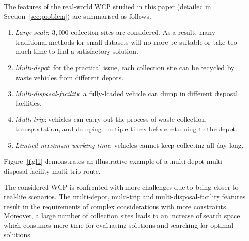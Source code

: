 \documentclass[journal]{IEEEtran}
\begin{document}
The features of the real-world WCP studied in this paper (detailed in Section~\ref{sec:problem}) are summarised as follows. 
\begin{enumerate}[leftmargin=*,label=(\roman*)]
\item \emph{Large-scale}: $3,000$ collection sites are considered. As a result, many traditional methods for small datasets will no more be suitable or take too much time to find a satisfactory solution. 
\item \emph{Multi-depot}: for the practical issue, each collection site can be recycled by waste vehicles from different depots. 
\item \emph{Multi-disposal-facility}: a fully-loaded vehicle can dump in different disposal facilities. 
\item \emph{Multi-trip}: vehicles can carry out the process of waste collection, transportation, and dumping multiple times before returning to the depot.  
\item \emph{Limited maximum working time}: vehicles cannot keep collecting all day long. 
\end{enumerate}
Figure~\ref{figl1} demonstrates an illustrative example of a multi-depot multi-disposal-facility multi-trip route.

The considered WCP is confronted with more challenges due to being closer to real-life scenarios. The multi-depot, multi-trip and multi-disposal-facility features result in the requirements of complex considerations with more constraints. Moreover, a large number of collection sites leads to an increase of search space which consumes more time for evaluating solutions and searching for optimal solutions. 
\end{document}
